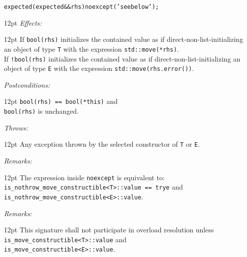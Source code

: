 \documentclass[a4paper,10pt]{article}
\newcommand{\cpp}[1]{\lstinline{#1}}
\newcommand{\wordingItem}[1]{\noindent\textit{#1:}}
\newenvironment{wordingTextItem}[1]{\wordingItem{#1}\vspace{2pt}\noindent\begin{adjustwidth}{12pt}{}}{\vspace{2pt}\end{adjustwidth}}
\newenvironment{wordingPara}{\begin{adjustwidth}{12pt}{}}{\end{adjustwidth}}
\begin{document}
\begin{alltt}
expected(expected && rhs) noexcept('see below');
\end{alltt}
\begin{wordingPara}
\begin{wordingTextItem}{Effects}
If \cpp{bool(rhs)} initializes the contained value as if direct-non-list-initializing an object of type \cpp{T} with the expression \cpp{std::move(*rhs)}. \\

\noindent
If \cpp{!bool(rhs)} initializes the contained value as if direct-non-list-initializing an object of type \cpp{E} with the expression \cpp{std::move(rhs.error())}.
\end{wordingTextItem}
\begin{wordingTextItem}{Postconditions}
\cpp{bool(rhs) == bool(*this)} and \\
\cpp{bool(rhs)} is unchanged.
\end{wordingTextItem}
\begin{wordingTextItem}{Throws}
Any exception thrown by the selected constructor of \cpp{T} or \cpp{E}.
\end{wordingTextItem}
\begin{wordingTextItem}{Remarks}
The expression inside \cpp{noexcept} is equivalent to:\\
\cpp{is_nothrow_move_constructible<T>::value == trye} and   \\
\cpp{is_nothrow_move_constructible<E>::value}.
\end{wordingTextItem}
\begin{wordingTextItem}{Remarks}
This signature shall not participate in overload resolution unless\\
\cpp{is_move_constructible<T>::value} and \\
\cpp{is_move_constructible<E>::value}.
\end{wordingTextItem}
\end{wordingPara}
\end{document}
